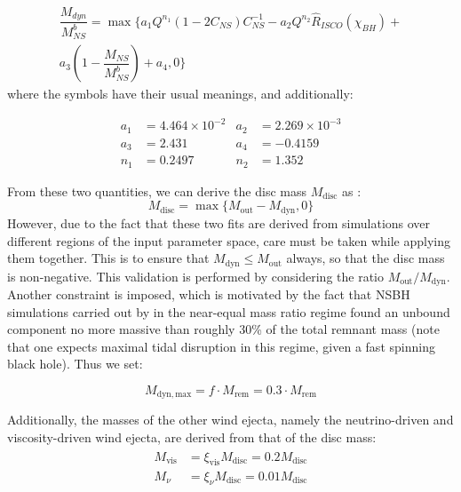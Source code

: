     \begin{multline}
        \dfrac{M_{dyn}}{M_{NS}^b} =
            \max \biggl\{
               a_1 Q^{n_1}(1 - 2C_{NS})C^{-1}_{NS} -
               a_2 Q^{n_2} \hat{R}_{ISCO}(\chi_{BH}) + \\
               a_3\left(1 - \dfrac{M_{NS}}{M^b_{NS}}\right) +
               a_4, 0
           \biggr\}
    \end{multline}
    where the symbols have their usual meanings, and additionally:

    \begin{align*}
        a_1 &= 4.464 \times 10^{-2} & a_2 &= 2.269 \times 10^{-3} \\
        a_3 &= 2.431 & a_4 &= -0.4159 \\
        n_1 &= 0.2497 & n_2 &= 1.352
    \end{align*}

    From these two quantities, we can derive the disc mass $M_{\mathrm{disc}}$ as :
    \begin{equation}
        M_{\mathrm{disc}} = \max\{M_{\mathrm{out}} - M_{\mathrm{dyn}}, 0\}
    \end{equation}
    However, due to the fact that these two fits are derived from simulations over
    different regions of the input parameter space, care must be taken while applying
    them together. This is to ensure that $M_{\mathrm{dyn}} \leq M_{\mathrm{out}}$
    always, so that the disc mass is non-negative. This validation is performed by
    considering the ratio $M_{\mathrm{out}} / M_{\mathrm{dyn}}$. Another constraint is
    imposed, which is motivated by the fact that NSBH simulations carried out by
    \cite{foucart_2019} in the near-equal mass ratio regime found an unbound component
    no more massive than roughly 30\% of the total remnant mass (note that one expects
    maximal tidal disruption in this regime, given a fast spinning black hole). Thus we
    set:

    \begin{equation}
        \label{eq:constraint}
        M_{\mathrm{dyn, max}} = f \cdot M_{\mathrm{rem}} = 0.3 \cdot M_{\mathrm{rem}}
    \end{equation}


    Additionally, the masses of the other wind ejecta, namely the neutrino-driven and
    viscosity-driven wind ejecta, are derived from that of the disc mass:
    \begin{align}
        \begin{split}
            M_{\mathrm{vis}} &=
                \xi_{\mathrm{vis}}M_{\mathrm{disc}} =
                    0.2M_{\mathrm{disc}} \\
            M_{\nu} &=
                \xi_{\nu}M_{\mathrm{disc}} =
                    0.01 M_{\mathrm{disc}}
        \end{split}
    \end{align}

